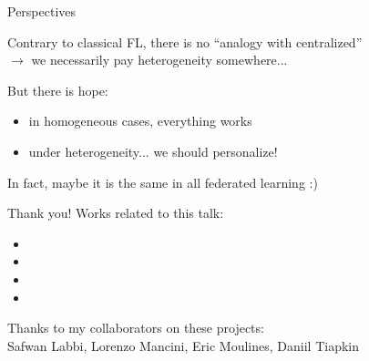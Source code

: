 \documentclass[12pt,aspectratio=169]{beamer}
\begin{document}
\begin{frame}{Perspectives}
  
  Contrary to classical FL, there is no ``analogy with centralized'' \\
  $\rightarrow$ we necessarily pay heterogeneity somewhere...

  But there is hope:
  \begin{itemize}
  \item in homogeneous cases, everything works
  \item under heterogeneity... we should personalize!
  \end{itemize}

  In fact, maybe it is the same in all federated learning :)
\end{frame}


\begin{frame}{Thank you!}
  Works related to this talk:
  \begin{itemize}
    \scriptsize
  \item {}
  \item {}
  \item {}
  \item {}
  \end{itemize}

  Thanks to my collaborators on these projects: \\
  \hspace{2em} Safwan Labbi, Lorenzo Mancini, Eric Moulines, Daniil Tiapkin
\end{frame}
\end{document}
